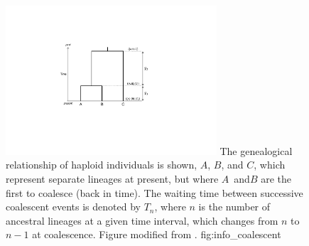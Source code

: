 

\begin{figure}[!htb]
\centering
\includegraphics[width=0.7\textwidth]{./img/ch1/info_coalescent}
{The genealogical relationship of  haploid individuals is shown, $A$, $B$, and $C$, which represent separate lineages at present, but where $A$~and$B$ are the first to coalesce (back in time).
The waiting time between successive coalescent events is denoted by $T_n$, where $n$ is the number of ancestral lineages at a given time interval, which changes from $n$ to ${n-1}$ at coalescence.
Figure modified from \citet{nordborg2001coalescent}.}
{fig:info_coalescent}
\end{figure}
